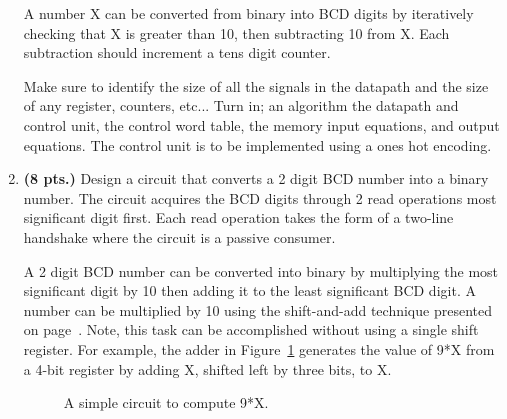 \begin{enumerate}
        A number X can be converted from binary into BCD digits by iteratively
        checking that X is greater than 10, then subtracting 10 from X.  Each
        subtraction should increment a tens digit counter.

        Make sure to identify the size of all the signals in the datapath
        and the size of any register, counters, etc...
        Turn in; an algorithm the datapath and control unit, the control word
        table, the memory input equations, and output equations.
        The control unit is to be implemented using a ones hot encoding.

    \item \textbf{ (8 pts.)}
        Design a circuit that converts a 2 digit BCD number into a
        binary number.  The circuit acquires the BCD digits through 2 read
        operations most significant digit first.  Each read operation takes
        the form of a two-line handshake where the circuit is a passive
        consumer.

        A 2 digit BCD number can be converted into binary by multiplying the
        most significant digit by 10 then adding it to the least significant
        BCD digit.  A number can be multiplied by 10 using the shift-and-add
        technique presented on page~\pageref{6-page:MulyBy10}.  Note, this
        task can be accomplished without using a single shift register.
        For example, the adder in Figure~\ref{fig:NineTimes} generates the value
        of 9*X from a 4-bit register by adding X, shifted left by three bits, to X.

        \begin{figure}[ht]
            \caption{A simple circuit to compute 9*X.}
            \label{fig:NineTimes}
        \end{figure}


\end{enumerate}
